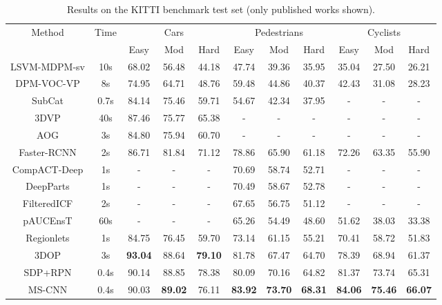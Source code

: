 \documentclass[runningheads]{llncs}
\begin{document}
\begin{table}[t]
\centering \scriptsize \setlength{\tabcolsep}{2pt}
\caption{Results on the KITTI benchmark test set (only published works shown).}
\label{tab:kitti comparison}
\begin{tabular}
{|c||c||ccc||ccc||ccc|}\hline
\multirow{2}{*}{Method}
&\multirow{2}{*}{Time}
&\multicolumn{3}{|c||}{Cars}
&\multicolumn{3}{|c||}{Pedestrians}
&\multicolumn{3}{|c|}{Cyclists}\\
\cline{3-11}
&\multicolumn{1}{|c||}{} & Easy & Mod & Hard & Easy & Mod & Hard & Easy & Mod & Hard \\\hline
LSVM-MDPM-sv \cite{DBLP:conf/nips/GeigerWU11} &10s &68.02 &56.48 &44.18 &47.74 &39.36 &35.95 &35.04 &27.50 &26.21\\
DPM-VOC-VP \cite{DBLP:journals/pami/Pepik0GS15} &8s &74.95 &64.71 &48.76 &59.48 &44.86 &40.37 &42.43 &31.08 &28.23\\
SubCat \cite{DBLP:journals/tits/Ohn-BarT15} &0.7s &84.14 &75.46 &59.71 &54.67 &42.34 &37.95 &- &- &-\\
3DVP \cite{DBLP:conf/cvpr/XiangCLS15} &40s &87.46 &75.77 &65.38 &- &- &- &- &- &-\\
AOG \cite{DBLP:conf/eccv/LiWZ14} &3s &84.80 &75.94 &60.70 &- &- &- &- &- &-\\
Faster-RCNN \cite{DBLP:conf/nips/shaoqing15fasterRcnn} &2s &86.71 &81.84 &71.12 &78.86 &65.90 &61.18 &72.26 &63.35 &55.90\\
CompACT-Deep \cite{DBLP:conf/iccv/CaiSV15}  &1s &- &- &- &70.69 &58.74 &52.71 &- &- &-\\
DeepParts \cite{DBLP:conf/iccv/TianLWT15} &1s &- &- &- &70.49 &58.67 &52.78 &- &- &-\\
FilteredICF \cite{DBLP:conf/cvpr/ZhangBS15} &2s &- &- &- &67.65 &56.75 &51.12 &- &- &-\\
pAUCEnsT \cite{DBLP:journals/corr/PaisitkriangkraiSH14b} &60s &- &- &- &65.26 &54.49 &48.60 &51.62 &38.03 &33.38\\
Regionlets \cite{DBLP:conf/iccv/WangYZL13} &1s &84.75  &76.45 &59.70 &73.14 &61.15 &55.21 &70.41 &58.72 &51.83\\
3DOP \cite{DBLP:conf/nips/XiaozhiNIPS15} &3s  &\textbf{\color{red}93.04} &88.64 &\textbf{\color{red}79.10} &81.78 &67.47 &64.70 &78.39 &68.94 &61.37\\
SDP+RPN \cite{DBLP:conf/cvpr/yang2016sdp} &0.4s &90.14  &88.85 &78.38 &80.09 &70.16 &64.82 &81.37 &73.74 &65.31\\\hline
MS-CNN &0.4s &90.03  &\textbf{\color{red}89.02}  &76.11  &\textbf{\color{red}83.92}  &\textbf{\color{red}73.70}  &\textbf{\color{red}68.31} &\textbf{\color{red}84.06} &\textbf{\color{red}75.46} &\textbf{\color{red}66.07}\\\hline
\end{tabular}
\end{table}
\end{document}
